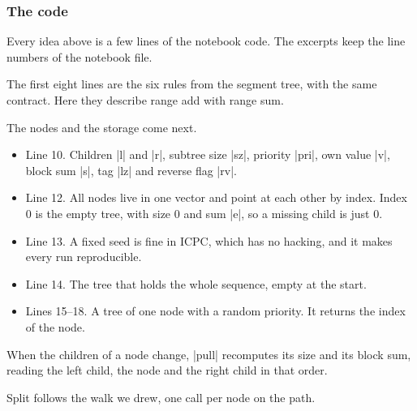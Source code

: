 \subsubsection{The code}
Every idea above is a few lines of the notebook code. The excerpts keep the line numbers of the notebook file.

The first eight lines are the six rules from the segment tree, with the same contract. Here they describe range add with range sum.


The nodes and the storage come next.


\begin{notes}
\begin{itemize}
\item Line 10. Children \code|l| and \code|r|, subtree size \code|sz|, priority \code|pri|, own value \code|v|, block sum \code|s|, tag \code|lz| and reverse flag \code|rv|.
\item Line 12. All nodes live in one vector and point at each other by index. Index 0 is the empty tree, with size 0 and sum \code|e|, so a missing child is just 0.
\item Line 13. A fixed seed is fine in ICPC, which has no hacking, and it makes every run reproducible.
\item Line 14. The tree that holds the whole sequence, empty at the start.
\item Lines 15--18. A tree of one node with a random priority. It returns the index of the node.
\end{itemize}
\end{notes}

When the children of a node change, \code|pull| recomputes its size and its block sum, reading the left child, the node and the right child in that order.


Split follows the walk we drew, one call per node on the path.


